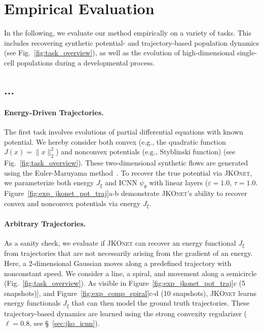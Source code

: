 \section{Empirical Evaluation} \label{sec:evaluation}
In the following, we evaluate our method empirically on a variety of tasks. This includes recovering synthetic potential- and trajectory-based population dynamics (see Fig.~\ref{fig:task_overview}), as well as the evolution of high-dimensional single-cell populations during a developmental process. 

\subsection{...} \label{sec:eval_synt}
\paragraph{Energy-Driven Trajectories.} The first task involves evolutions of partial differential equations with known potential. We hereby consider both convex (e.g., the quadratic function $J(x) = \|x\|^2_2$) and nonconvex potentials (e.g., Styblinski function) (see Fig.~\ref{fig:task_overview}). These two-dimensional synthetic flows are generated using the Euler-Maruyama method~\citep{kloeden1992stochastic}. 
To recover the true potential via \textsc{JKOnet}, we parameterize both energy $J_\xi$ and ICNN $\psi_\theta$ with linear layers ($\varepsilon = 1.0$, $\tau = 1.0$.
Figure~\ref{fig:exp_jkonet_pot_traj}a-b demonstrate \textsc{JKOnet}'s ability to recover convex and nonconvex potentials via energy $J_\xi$.

\paragraph{Arbitrary Trajectories.} As a sanity check, we evaluate if \textsc{JKOnet} can recover an energy functional $J_\xi$ from trajectories that are not necessarily arising from the gradient of an energy. Here, a 2-dimensional Gaussian moves along a predefined trajectory with nonconstant speed. 
We consider a line, a spiral, and movement along a semicircle (Fig.~\ref{fig:task_overview}). As visible in Figure~\ref{fig:exp_jkonet_pot_traj}c (5 snapshots)], and Figure~\ref{fig:exp_comp_spiral}c-d (10 snapshots), \textsc{JKOnet} learns energy functionals $J_\xi$ that can then model the ground truth trajectories.
These trajectory-based dynamics are learned using the strong convexity regularizer ($\ell=0.8$, see \S~\ref{sec:jko_icnn}).

